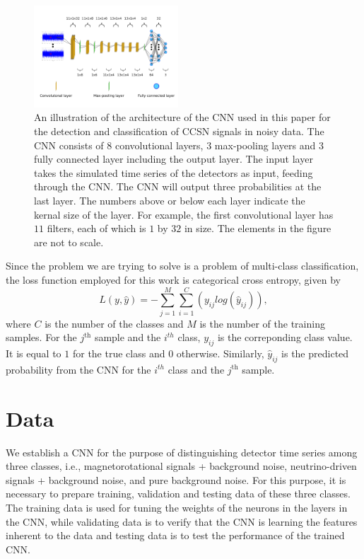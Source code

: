 \documentclass[aps,twocolumn,showpacs,groupedaddress, nofootinbib]{revtex4}  %
\begin{document}
\begin{figure}
\includegraphics[width=0.48\textwidth]{CNN2.png}
\caption{An illustration of the architecture of the \ac{CNN} used in this paper for the detection and classification of \ac{CCSN} signals in noisy data.
The \ac{CNN} consists of $8$ convolutional layers, $3$ max-pooling layers and $3$ fully connected layer including the output layer.
The input layer takes the simulated time series of the detectors as input, feeding through the \ac{CNN}. The \ac{CNN} will output three probabilities at the last layer.
The numbers above or below each layer indicate the kernal size of the layer. For example, the first convolutional layer has $11$ filters, 
each of which is $1$ by $32$ in size. 
The elements in the figure are not to scale.
\label{fig:CNN}}
\end{figure}
Since the problem we are trying to solve is a problem of multi-class classification, 
the loss function employed for this work is categorical cross entropy\cite{abadi2016tensorflow}, given by
\begin{equation}\label{eq:cce}
 L(y,\hat{y}) = -\sum^M_{j=1}\sum^C_{i=1}(y_{ij}log(\hat{y}_{ij})),
\end{equation}
where $C$ is the number of the classes and $M$ is the number of the training samples.
For the $j^{\text{th}}$ sample and the $i^{th}$ class, $y_{ij}$ is the correponding class value. It is equal to $1$ for the true class and $0$ otherwise.
Similarly, $\hat{y}_{ij}$ is the predicted probability from the \ac{CNN} for the $i^{th}$ class and the $j^{\text{th}}$ sample.


\section{Data}\label{sec:spwf}
We establish a \ac{CNN} for the purpose of distinguishing detector time series among three classes, 
i.e., magnetorotational signals + background noise, neutrino-driven signals + background noise, and pure background noise. 
For this purpose, it is necessary to prepare training, validation and testing data of these three classes.
The training data is used for tuning the weights of the neurons in the layers in the \ac{CNN}, 
while validating data is to verify that the \ac{CNN} is learning the features inherent to the data and testing data is to test the performance of the trained \ac{CNN}. 
\end{document}
